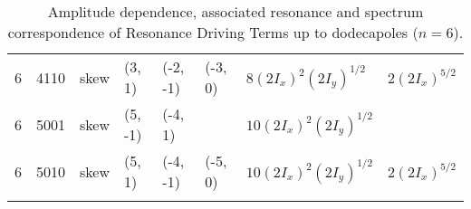 {\begin{longtable}{llllllll}
6 & 4110 &   skew &    (3, 1) & (-2, -1) &  (-3, 0) &   \colorbox{blue!10}{$8 (2I_x)^ {2} (2I_y)^ {1/2}$} &           \colorbox{orange!10}{$2 (2I_x)^ {5/2} $} \\
6 & 5001 &   skew &   (5, -1) &  (-4, 1) &          &  \colorbox{blue!10}{$10 (2I_x)^ {2} (2I_y)^ {1/2}$} &                                                   \\
6 & 5010 &   skew &    (5, 1) & (-4, -1) &  (-5, 0) &  \colorbox{blue!10}{$10 (2I_x)^ {2} (2I_y)^ {1/2}$} &           \colorbox{orange!10}{$2 (2I_x)^ {5/2} $} \\
\bottomrule
\caption{Amplitude dependence, associated resonance and spectrum correspondence of Resonance Driving
Terms up to dodecapoles ($n=6$).}
\end{longtable}
}